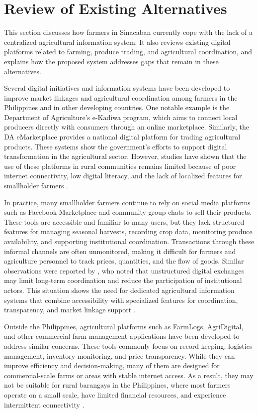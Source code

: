 \section{Review of Existing Alternatives}

This section discusses how farmers in Sinacaban currently cope with the lack of a centralized agricultural information system. It also reviews existing digital platforms related to farming, produce trading, and agricultural coordination, and explains how the proposed system addresses gaps that remain in these alternatives.

Several digital initiatives and information systems have been developed to improve market linkages and agricultural coordination among farmers in the Philippines and in other developing countries. One notable example is the Department of Agriculture's e-Kadiwa program, which aims to connect local producers directly with consumers through an online marketplace. Similarly, the DA eMarketplace provides a national digital platform for trading agricultural products. These systems show the government's efforts to support digital transformation in the agricultural sector. However, studies have shown that the use of these platforms in rural communities remains limited because of poor internet connectivity, low digital literacy, and the lack of localized features for smallholder farmers \citep{Briones2023,Pastolero2022}.

In practice, many smallholder farmers continue to rely on social media platforms such as Facebook Marketplace and community group chats to sell their products. These tools are accessible and familiar to many users, but they lack structured features for managing seasonal harvests, recording crop data, monitoring produce availability, and supporting institutional coordination. Transactions through these informal channels are often unmonitored, making it difficult for farmers and agriculture personnel to track prices, quantities, and the flow of goods. Similar observations were reported by \citet{Ma2024}, who noted that unstructured digital exchanges may limit long-term coordination and reduce the participation of institutional actors. This situation shows the need for dedicated agricultural information systems that combine accessibility with specialized features for coordination, transparency, and market linkage support \citep{JPAL2023,Qiang2012}.

Outside the Philippines, agricultural platforms such as FarmLogs, AgriDigital, and other commercial farm-management applications have been developed to address similar concerns. These tools commonly focus on record-keeping, logistics management, inventory monitoring, and price transparency. While they can improve efficiency and decision-making, many of them are designed for commercial-scale farms or areas with stable internet access. As a result, they may not be suitable for rural barangays in the Philippines, where most farmers operate on a small scale, have limited financial resources, and experience intermittent connectivity \citep{Ma2024}.

